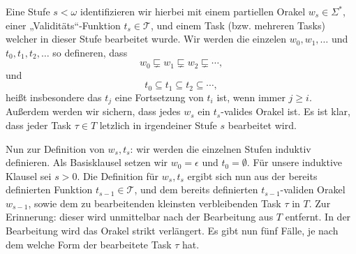 Eine Stufe $s<\omega$ identifizieren wir hierbei mit einem partiellen Orakel $w_s\in\Sigma^*$, einer „Validitäts“-Funktion $t_s\in\mathcal T$, und einem Task (bzw. mehreren Tasks) welcher in dieser Stufe bearbeitet wurde.
Wir werden die einzelen $w_0, w_1, \dots$ und $t_0, t_1, t_2, \dots$ so defineren, dass
\[ w_0\sqsubsetneq w_1 \sqsubsetneq w_2 \sqsubsetneq \cdots, \]
und 
\[ t_0 \subseteq t_1 \subseteq t_2 \subseteq \cdots, \]
heißt insbesondere das $t_j$ eine Fortsetzung von $t_i$ ist, wenn immer $j\geq i$.
Außerdem werden wir sichern, dass jedes $w_s$ ein $t_s$-valides Orakel ist.
Es ist klar, dass jeder Task $\tau\in T$ letzlich in irgendeiner Stufe $s$ bearbeitet wird.


Nun zur Definition von $w_s, t_s$: wir werden die einzelnen Stufen induktiv definieren. Als Basisklausel setzen wir $w_0 = \epsilon$ und $t_0 = \emptyset$.
Für unsere induktive Klausel sei $s>0$. Die Definition für $w_s, t_s$ ergibt sich nun aus der bereits definierten Funktion $t_{s-1}\in\mathcal T$, und dem bereits definierten $t_{s-1}$-validen Orakel $w_{s-1}$, sowie dem zu bearbeitenden kleinsten verbleibenden Task $\tau$ in $T$.
Zur Erinnerung: dieser wird unmittelbar nach der Bearbeitung aus $T$ entfernt. In der Bearbeitung wird das Orakel strikt verlängert.
Es gibt nun fünf Fälle, je nach dem welche Form der bearbeitete Task $\tau$ hat.
